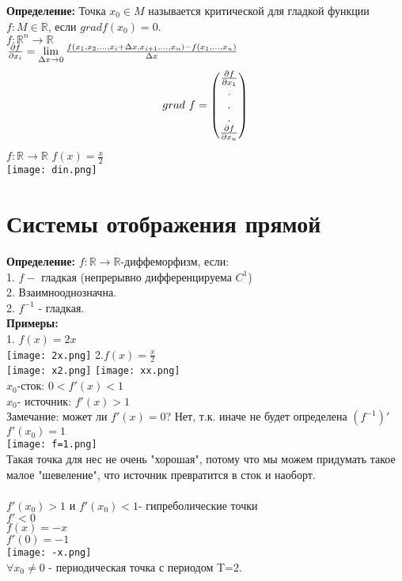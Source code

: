 \documentclass[12pt,a4paper]{article}
\begin{document}
\textbf{Определение: } Точка \(x_0\in M\) называется критической для гладкой функции \(f: M \in \mathbb{R}\), если \(grad f(x_0)=0\).\\
\(f:\mathbb{R}^n \to \mathbb{R}\)\\
\({\partial f\over {\partial x_i}} = \lim \limits_{\Delta x\to 0}\frac{f(x_1,x_2,...,x_i +\Delta x,x_{i+1},...,x_n)-f(x_1,...,x_n)}{\Delta x}\)
\begin{equation*}
grad\ f= 
\begin{pmatrix}
\partial f\over {\partial x_1}\\
.\\
.\\
.\\
\partial f\over {\partial x_n}
\end{pmatrix}
\end{equation*}
\(f: \mathbb{R}\to \mathbb{R}\)
\(f(x)=\frac{x}{2}\)\\
\texttt{[image: din.png]}
\section*{Системы отображения прямой}
\textbf{Определение: }\(f:\mathbb{R}\to \mathbb{R}\)-диффеморфизм, если:\\
1. \(f-\) гладкая (непрерывно дифференцируема \(C^1\))\\
2. Взаимнооднозначна.\\
2. \(f^{-1}\) - гладкая.\\
\textbf{Примеры: }\\
1. \(f(x)=2x\)\\
\texttt{[image: 2x.png]}
2.\(f(x)=\frac{x}{2}\)\\
\texttt{[image: x2.png]}
\newpage
\texttt{[image: xx.png]}\\
\(x_0\)-сток: \(0<f'(x)<1\)\\
\(x_0\)- источник: \(f'(x)>1\)\\
Замечание: может ли \(f'(x)=0\)? Нет, т.к. иначе не будет определена \((f^{-1})'\)\\
\(f'(x_0)=1\)\\
\texttt{[image: f=1.png]}\\
Такая точка для нес не очень "хорошая", потому что мы можем придумать такое малое "шевеление", что источник превратится в сток и наоборт. \\
\\
\(f'(x_0)>1\) и \(f'(x_0)<1\)- гипреболические точки\\ \newpage
\(f'<0\)\\
\(f(x)=-x\)\\\(f'(0)=-1\)\\ \texttt{[image: -x.png]}\\ \(\forall x_0 \neq 0\) - периодическая точка с периодом T=2.
\end{document}
